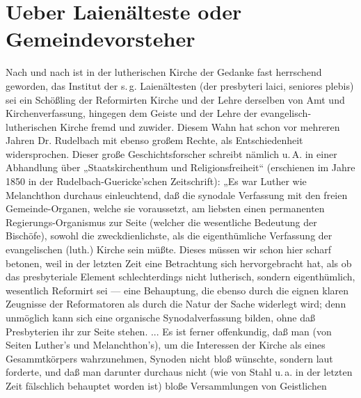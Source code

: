 \chapter[Ueber Laienälteste]{Ueber Laienälteste oder Gemeindevorsteher}

Nach und nach ist in der lutherischen Kirche der Gedanke fast herrschend geworden, das Institut der s.\,g. Laienältesten
(der presbyteri laici, seniores plebis) sei ein Schößling der Reformirten Kirche und der Lehre derselben von
Amt und Kirchenverfassung, hingegen dem Geiste und der Lehre der evangelisch-lutherischen Kirche fremd und
zuwider. Diesem Wahn hat schon vor mehreren Jahren Dr. Rudelbach mit ebenso großem Rechte, als Entschiedenheit
widersprochen. Dieser große Geschichtsforscher schreibt nämlich u.\,A. in einer Abhandlung über „Staatskirchenthum
und Religionsfreiheit“ (erschienen im Jahre 1850 in der Rudelbach-Guericke’schen Zeitschrift): „Es war Luther
wie Melanchthon durchaus einleuchtend, daß die synodale Verfassung mit den freien Gemeinde-Organen, welche sie
voraussetzt, am liebsten einen permanenten Regierungs-Organismus zur Seite (welcher die wesentliche Bedeutung der
Bischöfe), sowohl die zweckdienlichste, als die eigenthümliche Verfassung der evangelischen (luth.) Kirche sein
müßte. Dieses müssen wir schon hier scharf betonen, weil in der letzten Zeit eine Betrachtung sich hervorgebracht
hat, als ob das presbyteriale Element schlechterdings nicht lutherisch, sondern eigenthümlich, wesentlich Reformirt
sei — eine Behauptung, die ebenso durch die eignen klaren Zeugnisse der Reformatoren als durch die Natur der
Sache widerlegt wird; denn unmöglich kann sich eine organische Synodalverfassung bilden, ohne daß Presbyterien
ihr zur Seite stehen. ... Es ist ferner offenkundig, daß man (von Seiten Luther’s und Melanchthon’s), um die
Interessen der Kirche als eines Gesammtkörpers wahrzunehmen, Synoden nicht bloß wünschte, sondern laut forderte,
und daß man darunter durchaus nicht (wie von Stahl u.\,a. in der letzten Zeit fälschlich behauptet worden ist)
bloße Versammlungen von Geistlichen
